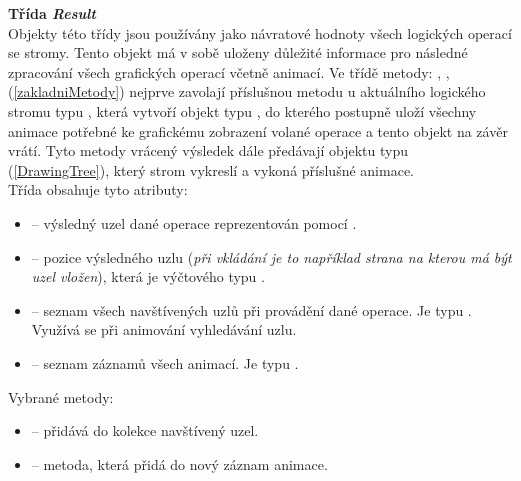 \documentclass[
  biblatex=false,
  font=serif,
  glossaries=false,
  tables=false,
  theorems=false,
  index
]{kidiplom}
\begin{document}
\noindent \textbf{Třída \textit{Result}} \label{Result}\\
\indent Objekty této třídy jsou používány jako návratové hodnoty všech logických operací se stromy. Tento objekt má v sobě uloženy důležité informace pro následné zpracování všech grafických operací včetně animací. Ve třídě metody:  ,  ,  (\ref{zakladniMetody}) nejprve zavolají příslušnou metodu u aktuálního logického stromu typu , která vytvoří objekt typu , do kterého  postupně uloží všechny animace potřebné ke grafickému zobrazení volané operace a tento objekt na závěr vrátí. Tyto metody vrácený výsledek dále předávají objektu typu  (\ref{DrawingTree}), který strom vykreslí a vykoná příslušné animace.\\
\noindent Třída obsahuje tyto atributy: 
\begin{itemize}
\item {} -- výsledný uzel dané operace reprezentován pomocí .
\item {} -- pozice výsledného uzlu (\textit{při vkládání je to například strana na kterou má být uzel vložen}), která je výčtového typu . 
\item {} -- seznam všech navštívených uzlů při provádění dané operace. Je typu . Využívá se při animování vyhledávání uzlu. 
\item {} -- seznam záznamů všech animací. Je typu . 
\end{itemize}

\newpage
\noindent Vybrané metody:
\begin{itemize}
\item {} -- přidává do kolekce  navštívený uzel.

\item {} -- metoda, která přidá do  nový záznam animace.
\end{itemize}
\end{document}
